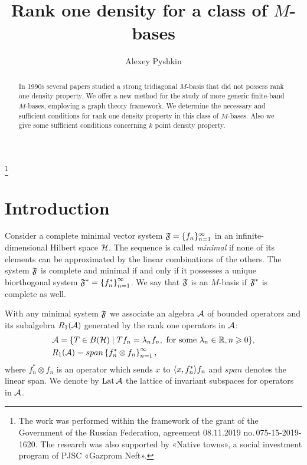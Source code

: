 \documentclass[12pt,oneside,a4paper]{amsart}
\begin{document}
\title{Rank one density for a class of $M$-bases}
\author{Alexey Pyshkin}
\address{Chebyshev Laboratory, Saint Petersburg State University, 14th Line V.O. 29, Saint Petersburg 199178, Russia}
\address{Saint Petersburg Department of RAS, Steklov Math. Institute, Fontanka 27, Saint Petersburg 191023, Russia}
\address{Euler International Mathematical Institute, nab.\,Pesochnaya 10, Saint Petersburg 197022, Russia}


\begin{abstract}
  In 1990s several papers studied a strong tridiagonal $M$-basis
    that did not possess rank one density property.
  We offer a new method for the study of more generic finite-band $M$-bases,
    employing a graph theory framework.
  We determine the necessary and sufficient conditions for rank one density property
    in this class of $M$-bases.
  Also we give some sufficient conditions concerning $k$ point density property.
\end{abstract}
\thanks{
        The work was performed within the framework of the grant of the Government
          of the Russian Federation, agreement 08.11.2019 no.\,075-15-2019-1620.
        The research was also supported by «Native towns», a social investment program of PJSC «Gazprom Neft».
        }
\maketitle
\section{Introduction}
  Consider a complete minimal vector system $\fsys = \seq{f}$ in an infinite-dimensional Hilbert space $\cal{H}$.
  The sequence is called \emph{minimal} if none of its elements can be approximated by the linear combinations of the others.
  The system $\fsys$ is complete and minimal if and only if it possesses a unique biorthogonal system $\fstarsys=\left\{f_n^*\right\}_{n=1}^\infty$.
  We say that $\fsys$ is an $M$-basis if $\fstarsys$ is complete as well.

  With any minimal system $\fsys$ we associate an algebra $\cal{A}$ of bounded operators 
  and its subalgebra $R_1(\cal{A})$ generated by the rank one operators in $\cal{A}$:
  \begin{align*}
    &\cal{A} = \{T\in B(\cal{H}) \mid Tf_n = \lambda_n f_n, \text{ for some } \lambda_n \in \mathbb{R}, n \geq 0\},\\
    &R_1(\cal{A}) = span\left\{f^*_n \otimes f_n\right\}_{n = 1}^\infty,
  \end{align*}
  where $f^*_n \otimes f_n$ is an operator which sends $x$ to $\inner{x}{f^*_n} f_n$ and
    $span$ denotes the linear span.
  We denote by $\lattice$ the lattice of invariant subspaces for operators in $\cal{A}$.
\end{document}
